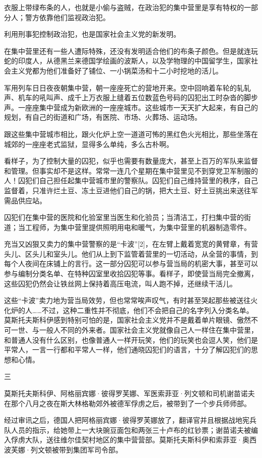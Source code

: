 衣服上带绿布条的人，也就是小偷与盗贼，在政治犯的集中营里是享有特权的一部分人；警方依靠他们监视政治犯。

利用刑事犯控制政治犯，也是国家社会主义党的新发明。

在集中营里还有一些人遭际特殊，还没有发明适合他们的布条子颜色。但是就连玩蛇的印度人，从德黑兰来德国学绘画的波斯人，以及学物理的中国留学生，国家社会主义党都为他们准备好了铺位、一小锅菜汤和十二小时挖地的活儿。

军用列车日日夜夜朝集中营，朝一座座死亡的营地开来。空中回响着车轮的轧轧声、机车的吼叫声、成千上万衣服上缝着五位数蓝色号码的囚犯出工时杂沓的脚步声。一座座集中营成为新欧洲的一座座城市。这些城市一天天扩大起来，有自己的规划，有自己的街道和广场，有医院、市场、火葬场、运动场。

跟这些集中营城市相比，跟火化炉上空一道道可怖的黑红色火光相比，那些坐落在城郊的一座座老式监狱，显得多么单纯，多么古朴啊。

看样子，为了控制大量的囚犯，似乎也需要有数量庞大，甚至上百万的军队来监督和管理。但事实却不是这样。常常一连几个星期在集中营里见不到穿党卫军制服的人！囚犯们自己担任起集中营城市里的警察队。囚犯们自己维持营里的秩序，自己监督着，只准许烂土豆、冻土豆进他们自己的锅，把大土豆、好土豆挑出来送往军需品供应站。

囚犯们在集中营的医院和化验室里当医生和化验员；当清洁工，打扫集中营的街道；当工程师，为集中营里提供照明用电和暖气，为集中营里的机器制造零件。

充当又凶狠又卖力的集中营警察的是“卡波”[2]，在左臂上戴着宽宽的黄臂章，有营头儿、区头儿和室头儿。他们从上到下监管着营里的一切活动，从全营的事情，到每个人夜间在床铺上的言行。这一部分囚犯可以参与营当局的机密大事，甚至可以参与编制分类名单、在特种囚室里收拾囚犯等事。看样子，即使营当局完全撤离，这些囚犯仍然会让铁丝网上保持着高压电流，叫人跑不掉，还继续干活儿。

这些“卡波”卖力地为营当局效劳，但也常常唉声叹气，有时甚至哭起那些被送往火化炉的人……不过，这种二重性并不彻底，他们不会把自己的名字列入分类名单。莫斯托夫斯科伊感到特别可怕的是，国家社会主义党并不是戴着单片眼镜、傲然不可一世、与一般人不同的外来者。国家社会主义党就像自己人一样住在集中营里，和普通人没有什么区别，也像普通人一样开玩笑，他们的玩笑也会逗人笑，他们是平常人，一言一行都和平常人一样，他们通晓囚犯们的语言，十分了解囚犯们的思想和心情。

三

莫斯托夫斯科伊、阿格丽宾娜·彼得罗芙娜、军医索菲亚·列文顿和司机谢苗诺夫在那个八月之夜在斯大林格勒郊外被德军俘虏之后，被带到了一个步兵师师部。

经过审讯之后，德国人把阿格丽宾娜·彼得罗芙娜放了，翻译官并且根据战地宪兵队人员的指示，给她带上一大块豌豆面包和两张三十卢布的红钞票；谢苗诺夫被编入俘虏大队，送往维尔佳契村地区的集中营营部。莫斯托夫斯科伊和索菲亚·奥西波芙娜·列文顿被带到集团军司令部。

